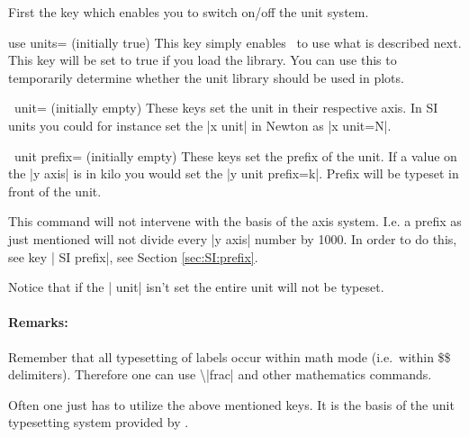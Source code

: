 First the key which enables you to switch on/off the unit system.
\begin{pgfplotskey}{use units= (initially true)}
  This key simply enables \PGFPlots\ to use what is described next. This key will be set to true if you load the library. You can use this to temporarily
  determine whether the unit library should be used in plots.
\end{pgfplotskey}
\begin{pgfplotsxykey}{\x\ unit= (initially empty)}
  These keys set the unit in their respective axis. In SI units you could for instance set the |x unit| in Newton as |x unit=N|.
\end{pgfplotsxykey}
\begin{pgfplotsxykey}{\x\ unit prefix= (initially empty)}
  These keys set the prefix of the unit. If a value on the |y axis| is in kilo you would set the |y unit prefix=k|. Prefix will be typeset in front of the unit.

  This command will not intervene with the basis of the axis system. I.e. a prefix as just mentioned will not divide every |y axis| number by 1000. 
  In order to do this, see key | SI prefix|, see Section \ref{sec:SI:prefix}.
  
  Notice that if the | unit| isn't set the entire unit will not be typeset.
  
  \paragraph{Remarks:} Remember that all typesetting of labels occur within math mode (i.e.\ within \$\$ delimiters). Therefore one can use \textbackslash|frac|
  and other mathematics commands.
\end{pgfplotsxykey}
Often one just has to utilize the above mentioned keys. It is the basis of the unit typesetting system provided by \PGFPlots.
\begin{codeexample}[]
\end{codeexample}

